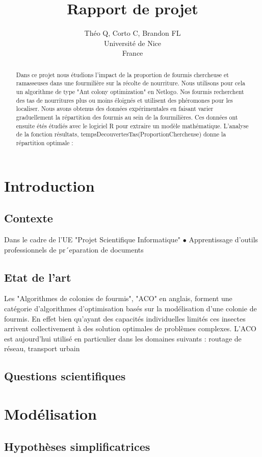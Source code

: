\documentclass{article}
\title{Rapport de projet}
\author{Théo Q, Corto C, Brandon FL \\
Université de Nice\\
France}
\begin{document}
\maketitle


\begin{abstract}
Dans ce projet nous étudions l'impact de la proportion de fourmis chercheuse et ramasseuses dans une fourmilière sur la récolte de nourriture. Nous utilisons pour cela un algorithme de type "Ant colony optimization" en Netlogo. Nos fourmis recherchent des tas de nourritures plus ou moins éloignés et utilisent des phéromones pour les localiser. Nous avons obtenus des données expérimentales en faisant varier graduellement la répartition des fourmis au sein de la fourmilières. Ces données ont ensuite étés  étudiés avec le logiciel R pour extraire un modèle mathématique. L'analyse de la fonction résultats, tempsDecouvertesTas(ProportionChercheuse) donne la répartition optimale : 
\end{abstract}
\section{Introduction}
\subsection{Contexte}
Dans le cadre de l'UE "Projet Scientifique Informatique" 
$\bullet$ Apprentissage d’outils professionnels de pr´eparation de
documents
\subsection{Etat de l'art}
Les "Algorithmes de colonies de fourmis", "ACO" en anglais, forment une catégorie d'algorithmes d'optimisation basés sur la modélisation d'une colonie de fourmis. En effet bien qu'ayant des capacités individuelles limités ces insectes arrivent collectivement à des solution optimales de problèmes complexes. 
L'ACO est aujourd’hui utilisé en particulier dans les domaines suivants : routage de réseau, transport urbain 
\subsection{Questions scientifiques}
\section{Modélisation}
\subsection{Hypothèses simplificatrices}
\end{document}
